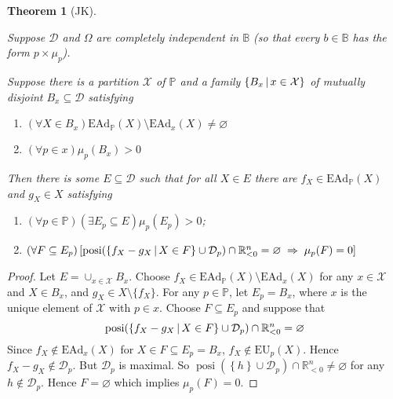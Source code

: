 \documentclass[a4paper]{article}
\newtheorem{theorem}{Theorem}
\DeclareMathOperator{\posi}{posi}
\newcommand\X{\mathcal{X}}
\renewcommand\P{\mathbb{P}} %
\newcommand\EU{\mathrm{EU}}
\newcommand\EAd{\mathrm{EAd}}
\newcommand{\D}{\mathcal{D}}
\newcommand{\Decs}{\mathcal{D}}
\newcommand{\IB}{\mathbb{B}}
\newcommand{\IP}{\P}
\newcommand\SetDelimiter[1][]{
	\nonscript\,#1\vert \allowbreak \nonscript\,\mathopen{}}
\providecommand\given{\SetDelimiter}
\newenvironment{CCM rewritten}
{\begingroup\color{blue}} %
{\endgroup}              %
\begin{document}
\begin{theorem}[JK]\label{thm:moregen2}

Suppose $\D$ and $\Omega$ are completely independent in $\IB$ (so that every $b\in\IB$ has the form $p\times\mu_p$).
	
	Suppose there is a partition $\X$ of $\IP$ and a family $\left\{ B_x \given x\in\X\right\}$ of mutually disjoint $B_x\subseteq\Decs$ satisfying
\begin{enumerate}
\item $(\forall X\in B_x)\EAd_\IP(X)\setminus\EAd_x(X)\not=\varnothing$
\item $(\forall p\in x)\mu_p(B_x)>0$
\end{enumerate}

	
	Then there is some $E\subseteq\Decs$ such that for all $X\in E$ there are $f_X\in\EAd_\IP(X)$ and $g_X\in X$ satisfying
\begin{enumerate}
\item $(\forall p\in\IP)(\exists E_p\subseteq E)\mu_p(E_p)>0$;
\item $(\forall F\subseteq E_p)\left[\posi(\left\{f_X-g_X\given X\in F\right\}\cup\D_p)\cap\mathbb{R}^n_{<0}=\varnothing\;\Rightarrow\;\mu_p(F)=0\right]$
\end{enumerate}

\end{theorem}

\begin{proof}
Let $E=\cup _{x\in\X} B_x$. Choose $f_X\in\EAd_\IP(X)\setminus\EAd_x(X)$ for any $x\in\X$ and $X\in B_x$, and $g_X\in X\setminus\{f_X\}$. For any $p\in\IP$, let $E_p=B_x$, where $x$ is the unique element of $\X$ with $p\in x$. Choose $F\subseteq E_p$ and suppose that 
\[
\posi(\left\{f_X-g_X\given X\in F\right\}\cup\D_p)\cap\mathbb{R}^n_{<0}=\varnothing
\]
Since $f_X\notin\EAd_x(X)$ for $X\in F\subseteq E_p=B_x$, $f_X\notin \EU_p(X)$. Hence $f_X-g_X \notin \D_p$. But $\D_p$ is maximal. So $\posi(\left\{h\right\}\cup\D_p)\cap\mathbb{R}^n_{<0}\not=\varnothing$ for any $h\notin \D_p$. Hence $F=\varnothing$ which implies $\mu_p(F)=0$.



\end{proof}
\end{document}
